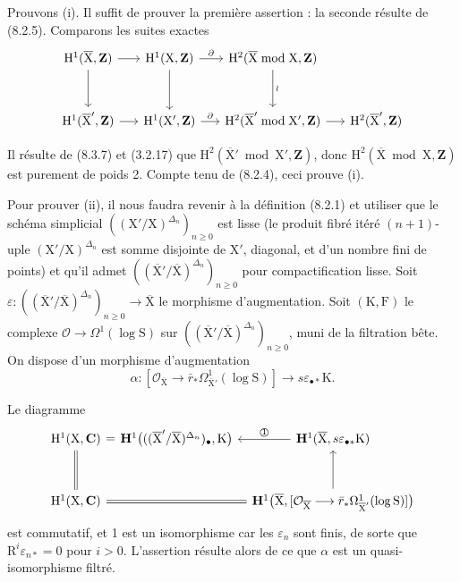 \documentclass[11pt,leqno]{article}
\begin{document}
Prouvons (i). Il suffit de prouver la première assertion : la seconde résulte de (8.2.5). Comparons les suites exactes
\[
\begin{tikzcd}[column sep=1.5em,row sep=3em]
\mathrm{H}^{1}(\overline{\mathrm{X}},\mathbf{Z})
 \arrow[r] \arrow[d]
&
\mathrm{H}^{1}(\mathrm{X},\mathbf{Z})
 \arrow[r,"\partial"] \arrow[d]
&
\mathrm{H}^{2}(\overline{\mathrm{X}}\bmod\mathrm{X},\mathbf{Z})
 \arrow[d,"\wr"]
&
\\
\mathrm{H}^{1}(\overline{\mathrm{X}}',\mathbf{Z})
 \arrow[r]
&
\mathrm{H}^{1}(\mathrm{X}',\mathbf{Z})
 \arrow[r,"\partial"]
&
\mathrm{H}^{2}(\overline{\mathrm{X}}'\bmod\mathrm{X}',\mathbf{Z})
 \arrow[r]
&
\mathrm{H}^{2}(\overline{\mathrm{X}}',\mathbf{Z})
\end{tikzcd}
\]

Il résulte de (8.3.7) et (3.2.17) que \(\mathrm{H}^{2}(\overline{\mathrm{X}}'\bmod\mathrm{X}',\mathbf{Z})\), donc \(\mathrm{H}^{2}(\overline{\mathrm{X}}\bmod\mathrm{X},\mathbf{Z})\) est purement de poids 2. Compte tenu de (8.2.4), ceci prouve (i).

Pour prouver (ii), il nous faudra revenir à la définition (8.2.1) et utiliser que le schéma simplicial \(((\mathrm{X}'/\mathrm{X})^{\Delta_n})_{n\geq0}\) est lisse (le produit fibré itéré \((n+1)\)-uple \((\mathrm{X}'/\mathrm{X})^{\Delta_n}\) est somme disjointe de \(\mathrm{X}'\), diagonal, et d’un nombre fini de points) et qu’il admet \(((\overline{\mathrm{X}}'/\overline{\mathrm{X}})^{\Delta_n})_{n\geq0}\) pour compactification lisse. Soit \(\varepsilon:((\overline{\mathrm{X}}'/\overline{\mathrm{X}})^{\Delta_n})_{n\geq0}\to\overline{\mathrm{X}}\) le morphisme d’augmentation. Soit \((\mathrm{K},\mathrm{F})\) le complexe \(\mathcal{O}\to\Omega^{1}(\log\mathrm{S})\) sur \(((\overline{\mathrm{X}}'/\overline{\mathrm{X}})^{\Delta_n})_{n\geq0}\), muni de la filtration bête. On dispose d’un morphisme d’augmentation
\[
\alpha:
[\mathcal{O}_{\overline{\mathrm{X}}}\to
 \bar r_*\Omega^{1}_{\overline{\mathrm{X}}'}(\log\mathrm{S})]
\longrightarrow s\varepsilon_{\bullet *}\mathrm{K}.
\]

Le diagramme
\[
\begin{tikzcd}[column sep=0.7em,row sep=3em]
\mathrm{H}^{1}(\mathrm{X},\mathbf{C})
 \arrow[r,phantom,"{\textstyle=}" description]
 \arrow[d,equal]
&
\mathbf{H}^{1}\bigl(
 ((\overline{\mathrm{X}}'/\overline{\mathrm{X}})^{\Delta_n})_{\bullet},
 \mathrm{K}\bigr)
&
\mathbf{H}^{1}(\overline{\mathrm{X}},s\varepsilon_{\bullet *}\mathrm{K})
 \arrow[l,"\text{\textcircled{1}}"']
\\
\mathrm{H}^{1}(\mathrm{X},\mathbf{C}) \arrow[rr,equal]
&&
\mathbf{H}^{1}\bigl(\overline{\mathrm{X}},
 [\mathcal{O}_{\overline{\mathrm{X}}}\longrightarrow
 \bar r_*\Omega^{1}_{\overline{\mathrm{X}}'}(\log\mathrm{S})]\bigr)
 \arrow[u]
\end{tikzcd}
\]
est commutatif, et 1 est un isomorphisme car les \(\varepsilon_n\) sont finis, de sorte que \(\mathrm{R}^{i}\varepsilon_{n*}=0\) pour \(i>0\). L’assertion résulte alors de ce que \(\alpha\) est un quasi-isomorphisme filtré.
\end{document}
